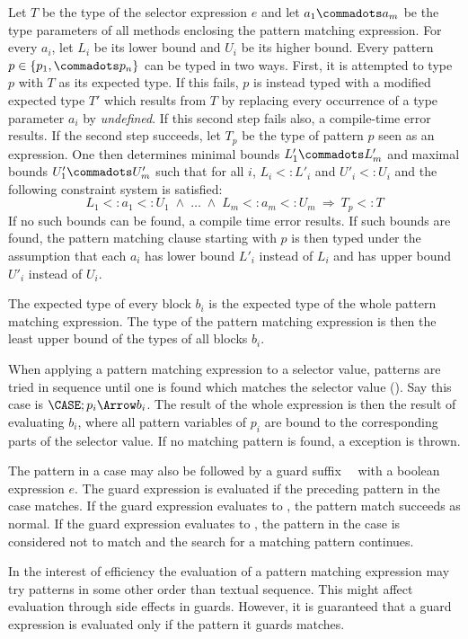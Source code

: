 Let $T$ be the type of the selector expression $e$ and let $a_1
\commadots a_m$ be the type parameters of all methods enclosing 
the pattern matching expression.  For every $a_i$, let $L_i$ be its
lower bound and $U_i$ be its higher bound.  Every pattern $p \in
\{p_1, \commadots p_n\}$ can be typed in two ways. First, it is attempted
to type $p$ with $T$ as its expected type. If this fails, $p$ is
instead typed with a modified expected type $T'$ which results from
$T$ by replacing every occurrence of a type parameter $a_i$ by
\mbox{\sl undefined}.  If this second step fails also, a compile-time
error results. If the second step succeeds, let $T_p$ be the type of
pattern $p$ seen as an expression. One then determines minimal bounds
$L'_1 \commadots L'_m$ and maximal bounds $U'_1 \commadots U'_m$ such
that for all $i$, $L_i <: L'_i$ and $U'_i <: U_i$ and the following
constraint system is satisfied:
\[
    L_1 <: a_1 <: U_1\;\wedge\;\ldots\;\wedge\;L_m <: a_m <: U_m
    \ \Rightarrow\ T_p <: T
\]
If no such bounds can be found, a compile time error results.  If such
bounds are found, the pattern matching clause starting with $p$ is
then typed under the assumption that each $a_i$ has lower bound $L'_i$
instead of $L_i$ and has upper bound $U'_i$ instead of $U_i$.

The expected type of every block $b_i$ is the expected type of the
whole pattern matching expression.  The type of the pattern matching
expression is then the least upper bound of the types of all blocks
$b_i$.

When applying a pattern matching expression to a selector value,
patterns are tried in sequence until one is found which matches the
selector value (). Say this case is $\CASE;p_i
\Arrow b_i$.  The result of the whole expression is then the result of
evaluating $b_i$, where all pattern variables of $p_i$ are bound to
the corresponding parts of the selector value.  If no matching pattern
is found, a  exception is thrown.

The pattern in a case may also be followed by a guard suffix \
\ with a boolean expression $e$.  The guard expression is
evaluated if the preceding pattern in the case matches. If the guard
expression evaluates to \code{true}, the pattern match succeeds as
normal. If the guard expression evaluates to \code{false}, the pattern
in the case is considered not to match and the search for a matching
pattern continues.

In the interest of efficiency the evaluation of a pattern matching
expression may try patterns in some other order than textual
sequence. This might affect evaluation through
side effects in guards. However, it is guaranteed that a guard
expression is evaluated only if the pattern it guards matches.


